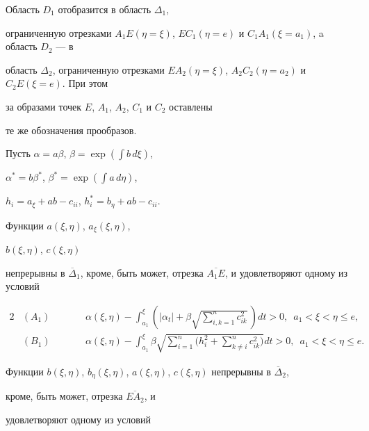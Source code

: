 Область $D_1$ отобразится в область $\Delta_1$,


ограниченную отрезками $A_1E (\eta =\xi)$, $EC_1 (\eta


=e)$ и $C_1A_1 (\xi =a_1)$, a область $D_2$ --- в


область $\Delta_2$, ограниченную отрезками $EA_2 (\eta


=\xi)$, $A_2C_2 (\eta =a_2)$ и $C_2E (\xi =e)$. При этом


за образами точек $E$, $A_1$, $A_2$, $C_1$ и $C_2$ оставлены


те же обозначения прообразов.





Пусть $\alpha =a\beta$, $\beta =\exp (\int b\,d\xi)$,


$\alpha^*=b \beta^*$, $\beta^*=\exp (\int a\,d\eta)$,


$h_i=a_{\xi }+ab-c_{ii}$, $h_i^*=b_{\eta }+ab-c_{ii}$.


Функции $a(\xi,\eta)$, $a_{\xi }(\xi,\eta)$,


$b(\xi,\eta)$, $c(\xi,\eta)$


непрерывны в $\overline \Delta_1$, кроме, быть может, отрезка $\overline


{A_1E}$, и удовлетворяют одному из условий


\begin{alignat*}{2}


&(A_1) &\qquad &\alpha (\xi,\eta)-


\int_{a_1}^{\xi }\left(|\alpha_t|+


\beta\sqrt{\sum_{i,k=1}^n c_{ik}^2}\,\right)dt>0,\ \;


a_1<\xi <\eta \le e,\\


%


&(B_1) &\qquad & \alpha (\xi,\eta)-


\int_{a_1}^{\xi }\beta \sqrt{\sum_{i=1}^n


\bigg(h_i^2+\sum_{k\ne i}^n c_{ik}^2\bigg)}dt>0,\ \;


a_1<\xi <\eta \le e.


\end{alignat*}


Функции $b(\xi,\eta)$, $b_{\eta }(\xi,\eta)$, $a(\xi


,\eta)$, $c(\xi,\eta)$ непрерывны в $\overline \Delta_2$,


кроме, быть может, отрезка $\overline {EA_2}$, и


удовлетворяют одному из условий


